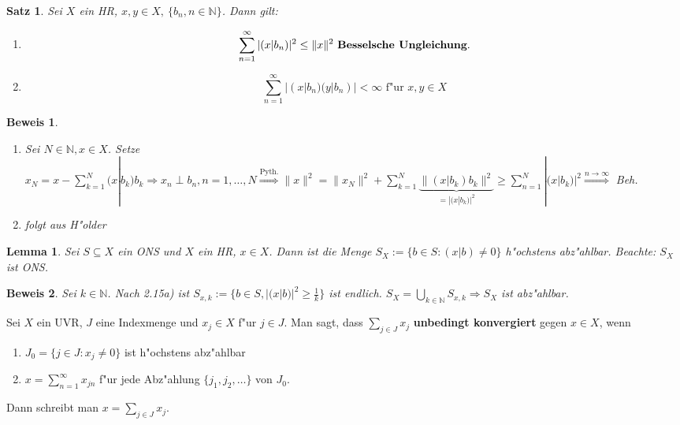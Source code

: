 \documentclass[a4paper,11pt]{book}
\newcommand{\N}{{\mathbb N}}
\newcommand{\begriff}[1]{\textbf{#1}} %
\newtheorem{Sa}[Def]{Satz}
\newtheorem{Lem}[Def]{Lemma}
\theoremstyle{nonumberplain}
\newtheorem{Bew}{Beweis}
\begin{document}
\begin{Sa}
Sei $X$ ein HR, $x,y \in X,\ \{b_n, n \in \N\}$. Dann gilt:
\begin{enumerate}
\item[a)]
\[
\sum_{n=1}^{\infty} |(x|b_n)|^2 \leq \|x\|^2 \text{ \begriff{Besselsche Ungleichung}.}
\]

\item[b)]
\[
\sum_{n=1}^{\infty} |(x|b_n)(y|b_n)| < \infty \text{ f"ur } x,y \in X
\]
\end{enumerate}
\end{Sa}


\begin{Bew}
\begin{enumerate}
\item[a)] Sei $N \in \N, x \in X$. Setze $x_N = x- \sum_{k=1}^N (x|b_k)b_k \Rightarrow x_n \perp b_n, n=1,\dots,N \stackrel{\text{Pyth.}}{\Rightarrow} \|x\|^2 = \|x_N\|^2 + \sum_{k=1}^N \underbrace{\| (x|b_k)b_k \|^2}_{= |(x|b_k)|^2} \geq \sum_{n=1}^N |(x|b_k)|^2 \stackrel{n \rightarrow \infty}{\Rightarrow}$ Beh.

\item[b)] folgt aus H"older
\end{enumerate}
\end{Bew}


\begin{Lem}
Sei $S \subseteq X$ ein ONS und $X$ ein HR, $x \in X$. Dann ist die Menge $S_X := \{ b \in S: (x|b) \not= 0\}$ h"ochstens abz"ahlbar. Beachte: $S_X$ ist ONS.
\end{Lem}

\begin{Bew}
Sei $k \in \N$. Nach 2.15a) ist $S_{x,k} := \{b \in S, |(x|b)|^2 \geq \frac1{k}\}$ ist endlich. $S_X = \bigcup_{k \in \N} S_{x,k} \Rightarrow S_X$ ist abz"ahlbar.
\end{Bew}

Sei $X$ ein UVR, $J$ eine Indexmenge und $x_j \in X$ f"ur $j \in J.$  Man sagt, dass $\sum_{j \in J} x_j$ \begriff{unbedingt konvergiert} gegen $x \in X$, wenn
\begin{enumerate}
\item[i)] $J_0 = \{j \in J: x_j \not= 0\}$ ist h"ochstens abz"ahlbar

\item[ii)] $x = \sum_{n=1}^{\infty} x_{jn}$ f"ur jede Abz"ahlung $\{ j_1, j_2,\dots\}$ von $J_0$.
\end{enumerate}
Dann schreibt man $x = \sum_{j \in J} x_j$.
\end{document}
